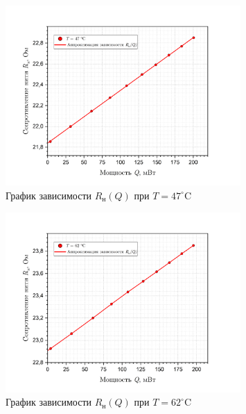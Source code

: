 \documentclass[a4paper, 12pt]{article}
\begin{document}
        \begin{figure}[H]
            \centering
            \includegraphics[width=0.8\textwidth]{images/R(Q)_47.png}
            \caption{График зависимости $R_{\text{н}}(Q)$ при $T = 47 ^\circ$C} 
            \label{graph:R(Q)_47}
        \end{figure}

        \begin{figure}[H]
            \centering
            \includegraphics[width=0.8\textwidth]{images/R(Q)_62.png}
            \caption{График зависимости $R_{\text{н}}(Q)$ при $T = 62 ^\circ$C} 
            \label{graph:R(Q)_62}
        \end{figure}
\end{document}
